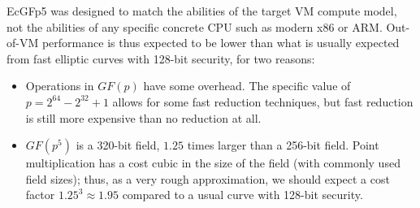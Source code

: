 \documentclass{llncs}
\newcommand{\GF}{GF}
\begin{document}
EcGFp5 was designed to match the abilities of the target VM compute
model, not the abilities of any specific concrete CPU such as modern x86
or ARM. Out-of-VM performance is thus expected to be lower than what
is usually expected from fast elliptic curves with 128-bit security,
for two reasons:
\begin{itemize}

    \item Operations in $\GF(p)$ have some overhead. The specific value
    of $p = 2^{64} - 2^{32} + 1$ allows for some fast reduction
    techniques, but fast reduction is still more expensive than no
    reduction at all.

    \item $\GF(p^5)$ is a 320-bit field, $1.25$ times larger than a
    256-bit field. Point multiplication has a cost cubic in the size
    of the field (with commonly used field sizes); thus, as a very
    rough approximation, we should expect a cost factor
    $1.25^3 \approx 1.95$ compared to a usual curve with 128-bit
    security.

\end{itemize}
\end{document}
